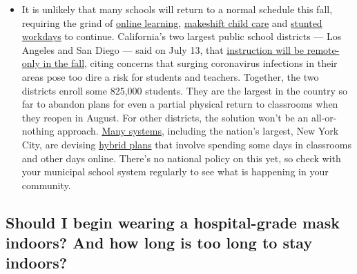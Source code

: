 \begin{itemize}
  \begin{itemize}
  \tightlist
  \item
    It is unlikely that many schools will return to a normal schedule
    this fall, requiring the grind of
    \href{https://www.nytimes3xbfgragh.onion/2020/06/05/us/coronavirus-education-lost-learning.html?action=click\&pgtype=Article\&state=default\&region=MAIN_CONTENT_3\&context=storylines_faq}{online
    learning},
    \href{https://www.nytimes3xbfgragh.onion/2020/05/29/us/coronavirus-child-care-centers.html?action=click\&pgtype=Article\&state=default\&region=MAIN_CONTENT_3\&context=storylines_faq}{makeshift
    child care} and
    \href{https://www.nytimes3xbfgragh.onion/2020/06/03/business/economy/coronavirus-working-women.html?action=click\&pgtype=Article\&state=default\&region=MAIN_CONTENT_3\&context=storylines_faq}{stunted
    workdays} to continue. California's two largest public school
    districts --- Los Angeles and San Diego --- said on July 13, that
    \href{https://www.nytimes3xbfgragh.onion/2020/07/13/us/lausd-san-diego-school-reopening.html?action=click\&pgtype=Article\&state=default\&region=MAIN_CONTENT_3\&context=storylines_faq}{instruction
    will be remote-only in the fall}, citing concerns that surging
    coronavirus infections in their areas pose too dire a risk for
    students and teachers. Together, the two districts enroll some
    825,000 students. They are the largest in the country so far to
    abandon plans for even a partial physical return to classrooms when
    they reopen in August. For other districts, the solution won't be an
    all-or-nothing approach.
    \href{https://bioethics.jhu.edu/research-and-outreach/projects/eschool-initiative/school-policy-tracker/}{Many
    systems}, including the nation's largest, New York City, are
    devising
    \href{https://www.nytimes3xbfgragh.onion/2020/06/26/us/coronavirus-schools-reopen-fall.html?action=click\&pgtype=Article\&state=default\&region=MAIN_CONTENT_3\&context=storylines_faq}{hybrid
    plans} that involve spending some days in classrooms and other days
    online. There's no national policy on this yet, so check with your
    municipal school system regularly to see what is happening in your
    community.
  \end{itemize}
\end{itemize}

\hypertarget{should-i-begin-wearing-a-hospital-grade-mask-indoors-and-how-long-is-too-long-to-stay-indoors}{%
\subsection{Should I begin wearing a hospital-grade mask indoors? And
how long is too long to stay
indoors?}\label{should-i-begin-wearing-a-hospital-grade-mask-indoors-and-how-long-is-too-long-to-stay-indoors}}

